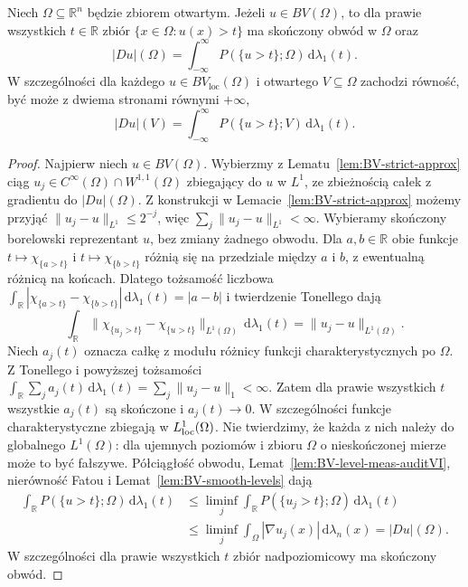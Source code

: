 \begin{twierdzenie}
\label{thm:BV-coarea-full-29}
Niech $\Omega\subseteq\mathbb R^n$ będzie zbiorem otwartym.
Jeżeli $u\in BV(\Omega)$, to dla prawie wszystkich
$t\in\mathbb R$ zbiór $\{x\in\Omega:u(x)>t\}$
ma skończony obwód w $\Omega$ oraz
\begin{equation}\label{eq:BV-coarea-full-29}
 |Du|(\Omega)=\int_{-\infty}^{\infty}
 P(\{u>t\};\Omega)\,\mathrm d\lambda_1(t).
\end{equation}
W szczególności dla każdego $u\in BV_{\mathrm{loc}}(\Omega)$
i otwartego $V\subseteq\Omega$ zachodzi równość,
być może z dwiema stronami równymi $+\infty$,
\[
 |Du|(V)=\int_{-\infty}^{\infty}
 P(\{u>t\};V)\,\mathrm d\lambda_1(t).
\]
\end{twierdzenie}
\begin{proof}
Najpierw niech $u\in BV(\Omega)$.
Wybierzmy z Lematu~\ref{lem:BV-strict-approx}
ciąg $u_j\in C^\infty(\Omega)\cap W^{1,1}(\Omega)$
zbiegający do $u$ w $L^1$, ze zbieżnością
całek z gradientu do $|Du|(\Omega)$.
Z konstrukcji w Lemacie~\ref{lem:BV-strict-approx}
możemy przyjąć $\|u_j-u\|_{L^1}\le2^{-j}$,
więc $\sum_j\|u_j-u\|_{L^1}<\infty$.
Wybieramy skończony borelowski reprezentant $u$,
bez zmiany żadnego obwodu.
Dla $a,b\in\mathbb R$ obie funkcje
$t\mapsto\chi_{\{a>t\}}$ i
$t\mapsto\chi_{\{b>t\}}$ różnią się na
przedziale między $a$ i $b$, z ewentualną
różnicą na końcach. Dlatego tożsamość liczbowa
$\int_{\mathbb R}|\chi_{\{a>t\}}-
\chi_{\{b>t\}}|\,\mathrm d\lambda_1(t)=|a-b|$
i twierdzenie Tonellego dają
\[
 \int_{\mathbb R}\|\chi_{\{u_j>t\}}-
 \chi_{\{u>t\}}\|_{L^1(\Omega)}
 \,\mathrm d\lambda_1(t)=\|u_j-u\|_{L^1(\Omega)}.
\]
Niech $a_j(t)$ oznacza całkę z modułu różnicy
funkcji charakterystycznych po $\Omega$.
Z Tonellego i powyższej tożsamości
$\int_{\mathbb R}\sum_j a_j(t)\,\mathrm d\lambda_1(t)
=\sum_j\|u_j-u\|_1<\infty$.
Zatem dla prawie wszystkich $t$ wszystkie
$a_j(t)$ są skończone i $a_j(t)\to0$.
W szczególności funkcje charakterystyczne
zbiegają w $L^1_{\rm loc}(\Omega)$.
Nie twierdzimy, że każda z nich należy
do globalnego $L^1(\Omega)$: dla ujemnych
poziomów i zbioru $\Omega$ o nieskończonej
mierze może to być fałszywe.
Półciągłość obwodu,
Lemat~\ref{lem:BV-level-meas-auditVI},
nierówność Fatou i Lemat~\ref{lem:BV-smooth-levels}
dają
\begin{align*}
 \int_{\mathbb R}P(\{u>t\};\Omega)\,
 \mathrm d\lambda_1(t)
 &\le\liminf_j\int_{\mathbb R}
 P(\{u_j>t\};\Omega)\,\mathrm d\lambda_1(t)\\
 &\le\liminf_j\int_\Omega|\nabla u_j(x)|
 \,\mathrm d\lambda_n(x)=|Du|(\Omega).
\end{align*}
W szczególności dla prawie wszystkich $t$
zbiór nadpoziomicowy ma skończony obwód.


\end{proof}
